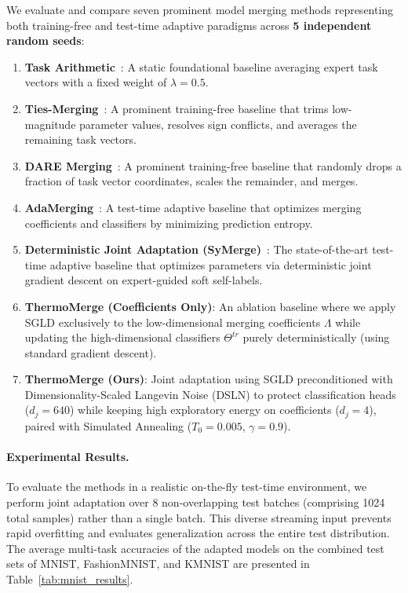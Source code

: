 We evaluate and compare seven prominent model merging methods representing both training-free and test-time adaptive paradigms across \textbf{5 independent random seeds}:
\begin{enumerate}
\item \textbf{Task Arithmetic}~\cite{ilharco2022editing}: A static foundational baseline averaging expert task vectors with a fixed weight of $\lambda = 0.5$.
\item \textbf{Ties-Merging}~\cite{yadav2023ties}: A prominent training-free baseline that trims low-magnitude parameter values, resolves sign conflicts, and averages the remaining task vectors.
\item \textbf{DARE Merging}~\cite{jin2023dataless}: A prominent training-free baseline that randomly drops a fraction of task vector coordinates, scales the remainder, and merges.
\item \textbf{AdaMerging}~\cite{yang2024adamerging}: A test-time adaptive baseline that optimizes merging coefficients and classifiers by minimizing prediction entropy.
\item \textbf{Deterministic Joint Adaptation (SyMerge)}~\cite{jung2025symerge}: The state-of-the-art test-time adaptive baseline that optimizes parameters via deterministic joint gradient descent on expert-guided soft self-labels.
\item \textbf{ThermoMerge (Coefficients Only)}: An ablation baseline where we apply SGLD exclusively to the low-dimensional merging coefficients $\Lambda$ while updating the high-dimensional classifiers $\Theta^{tr}$ purely deterministically (using standard gradient descent).
\item \textbf{ThermoMerge (Ours)}: Joint adaptation using SGLD preconditioned with Dimensionality-Scaled Langevin Noise (DSLN) to protect classification heads ($d_j=640$) while keeping high exploratory energy on coefficients ($d_j=4$), paired with Simulated Annealing ($T_0=0.005$, $\gamma=0.9$).
\end{enumerate}

\paragraph{Experimental Results.}
To evaluate the methods in a realistic on-the-fly test-time environment, we perform joint adaptation over 8 non-overlapping test batches (comprising 1024 total samples) rather than a single batch.
This diverse streaming input prevents rapid overfitting and evaluates generalization across the entire test distribution.
The average multi-task accuracies of the adapted models on the combined test sets of MNIST, FashionMNIST, and KMNIST are presented in Table~\ref{tab:mnist_results}.

